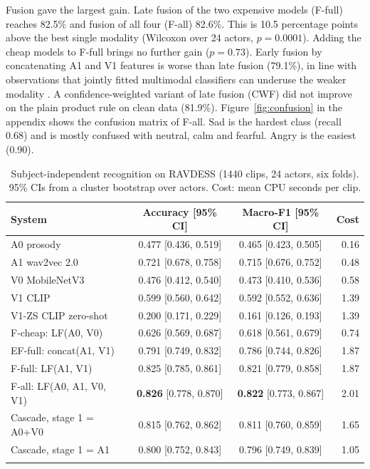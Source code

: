 Fusion gave the largest gain. Late fusion of the two expensive models (F-full) reaches 82.5\% and fusion of all four (F-all) 82.6\%. This is 10.5 percentage points above the best single modality (Wilcoxon over 24 actors, $p=0.0001$). Adding the cheap models to F-full brings no further gain ($p=0.73$). Early fusion by concatenating A1 and V1 features is worse than late fusion (79.1\%), in line with observations that jointly fitted multimodal classifiers can underuse the weaker modality \citep{wang2020}. A confidence-weighted variant of late fusion (CWF) did not improve on the plain product rule on clean data (81.9\%). Figure~\ref{fig:confusion} in the appendix shows the confusion matrix of F-all. Sad is the hardest class (recall 0.68) and is mostly confused with neutral, calm and fearful. Angry is the easiest (0.90).

\begin{table}[t]
\caption{Subject-independent recognition on RAVDESS (1440 clips, 24 actors, six folds). 95\% CIs from a cluster bootstrap over actors. Cost: mean CPU seconds per clip.}\label{tab:main}
\centering\footnotesize
\begin{tabular}{@{}lccr@{}}
\toprule
System & Accuracy [95\% CI] & Macro-F1 [95\% CI] & Cost \\
\midrule
A0 prosody & 0.477 [0.436, 0.519] & 0.465 [0.423, 0.505] & 0.16 \\
A1 wav2vec 2.0 & 0.721 [0.678, 0.758] & 0.715 [0.676, 0.752] & 0.48 \\
V0 MobileNetV3 & 0.476 [0.412, 0.540] & 0.473 [0.410, 0.536] & 0.58 \\
V1 CLIP & 0.599 [0.560, 0.642] & 0.592 [0.552, 0.636] & 1.39 \\
V1-ZS CLIP zero-shot & 0.200 [0.171, 0.229] & 0.161 [0.126, 0.193] & 1.39 \\
\midrule
F-cheap: LF(A0, V0) & 0.626 [0.569, 0.687] & 0.618 [0.561, 0.679] & 0.74 \\
EF-full: concat(A1, V1) & 0.791 [0.749, 0.832] & 0.786 [0.744, 0.826] & 1.87 \\
F-full: LF(A1, V1) & 0.825 [0.785, 0.861] & 0.821 [0.779, 0.858] & 1.87 \\
F-all: LF(A0, A1, V0, V1) & \textbf{0.826} [0.778, 0.870] & \textbf{0.822} [0.773, 0.867] & 2.01 \\
\midrule
Cascade, stage 1 = A0+V0 & 0.815 [0.762, 0.862] & 0.811 [0.760, 0.859] & 1.65 \\
Cascade, stage 1 = A1 & 0.800 [0.752, 0.843] & 0.796 [0.749, 0.839] & 1.05 \\
\botrule
\end{tabular}
\end{table}

